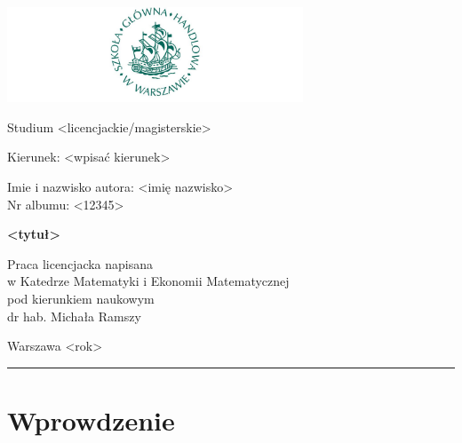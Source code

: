 \documentclass[polish, twoside, 12pt, a4paper]{article}
\theoremstyle{definition}
\theoremstyle{plain}
\theoremstyle{remark}
\begin{document}
\begin{titlepage}
\centering

\includegraphics[width=0.66\textwidth]{logo.JPG}

\vspace*{0.5cm}
Studium <licencjackie/magisterskie>\\
\begin{flushleft}
Kierunek: <wpisać kierunek>\\
\end{flushleft}

\vspace*{.5cm}
\rule{0cm}{1cm}\hfill
\begin{minipage}{9cm}
Imie i nazwisko autora: <imię nazwisko>\\
Nr albumu: <12345>
\end{minipage}

\vspace*{1cm}
\begin{minipage}{12cm}
\centering
\Large
\textbf{<tytuł>}
\end{minipage}

\vspace*{2cm}
\rule{0cm}{1cm}\hfill
\begin{minipage}{9cm}
Praca licencjacka napisana\\
w Katedrze Matematyki i Ekonomii Matematycznej\\
pod kierunkiem naukowym\\
dr hab. Michała Ramszy
\end{minipage}

\vfill
Warszawa <rok>
\end{titlepage}

\rule{1ex}{0ex}\clearpage


\cleardoublepage
\tableofcontents

\cleardoublepage
\section{Wprowdzenie}
\end{document}
